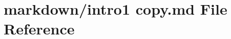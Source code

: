 \hypertarget{intro1_01copy_8md}{}\section{markdown/intro1 copy.\+md File Reference}
\label{intro1_01copy_8md}

